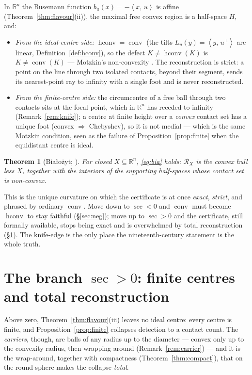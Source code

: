 \documentclass[11pt]{article}
\newtheorem{theorem}{Theorem}[section]
\theoremstyle{remark}
\newcommand{\R}{\mathbb{R}}
\newcommand{\X}{X}
\newcommand{\Rx}{\mathcal{R}_{\X}}
\newcommand{\conv}{\operatorname{conv}}
\newcommand{\hconv}{\operatorname{hconv}}
\newcommand{\sect}{\operatorname{sec}}
\newcommand{\sca}[2]{\left\langle #1,\, #2\right\rangle}
\begin{document}
In $\R^{n}$ the Busemann function $b_{u}(x)=-\sca{x}{u}$ is affine
(Theorem~\ref{thm:flavour}(ii)), the maximal free convex region is a
half-space $H$, and:
\begin{itemize}
\item \emph{From the ideal-centre side:} $\hconv=\conv$ (the tilts
$L_{u}(y)=\sca{y}{u^{\perp}}$ are linear, Definition~\ref{def:hconv}), so
the defect $K\neq\hconv(K)$ is $K\neq\conv(K)$ --- Motzkin's non-convexity
\cite{Mot}. The reconstruction is strict: a point on the line through two
isolated contacts, beyond their segment, sends its nearest-point ray to
infinity with a single foot and is never reconstructed.
\item \emph{From the finite-centre side:} the circumcentre of a free ball
through two contacts sits at the focal point, which in $\R^{n}$ has receded
to infinity (Remark~\ref{rem:knife}); a centre at finite height over a
\emph{convex} contact set has a unique foot (convex $\Rightarrow$
Chebyshev), so it is not medial --- which is the same Motzkin condition,
seen as the failure of Proposition~\ref{prop:finite} when the equidistant
centre is ideal.
\end{itemize}

\begin{theorem}[Bia\l{}o\.zyt; {\cite[Thm.~6]{Bia}}]\label{thm:bia}
For closed $\X\subseteq\R^{n}$, \eqref{eq:bia} holds: $\Rx$ is the convex
hull less $\X$, together with the interiors of the supporting half-spaces
whose contact set is non-convex.
\end{theorem}

This is the unique curvature on which the certificate is at once
\emph{exact}, \emph{strict}, and phrased by ordinary $\conv$. Move down to
$\sect<0$ and $\conv$ must become $\hconv$ to stay faithful
(\S\ref{sec:neg}); move up to $\sect>0$ and the certificate, still
formally available, stops being exact and is overwhelmed by total
reconstruction (\S\ref{sec:pos}). The knife-edge is the only place the
nineteenth-century statement is the whole truth.

\section{The branch $\sect>0$: finite centres and total reconstruction}
\label{sec:pos}

Above zero, Theorem~\ref{thm:flavour}(iii) leaves no ideal centre: every
centre is finite, and Proposition~\ref{prop:finite} collapses detection to
a contact count. The \emph{carriers}, though, are balls of any radius up to
the diameter --- convex only up to the convexity radius, then wrapping
around (Remark~\ref{rem:carrier}) --- and it is the wrap-around, together
with compactness (Theorem~\ref{thm:compact}), that on the round sphere
makes the collapse \emph{total}.
\end{document}
